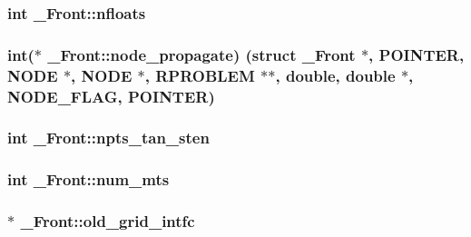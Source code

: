 \subsubsection[{\texorpdfstring{nfloats}{nfloats}}]{\setlength{\rightskip}{0pt plus 5cm}int \+\_\+\+Front\+::nfloats}\hypertarget{struct___front_ad141d8957da70837a6f62981b4fb11d1}{}\label{struct___front_ad141d8957da70837a6f62981b4fb11d1}
\subsubsection[{\texorpdfstring{node\+\_\+propagate}{node_propagate}}]{\setlength{\rightskip}{0pt plus 5cm}int($\ast$ \+\_\+\+Front\+::node\+\_\+propagate) (struct {\bf \+\_\+\+Front} $\ast$, {\bf P\+O\+I\+N\+T\+ER}, {\bf N\+O\+DE} $\ast$, {\bf N\+O\+DE} $\ast$, {\bf R\+P\+R\+O\+B\+L\+EM} $\ast$$\ast$, double, double $\ast$, {\bf N\+O\+D\+E\+\_\+\+F\+L\+AG}, {\bf P\+O\+I\+N\+T\+ER})}\hypertarget{struct___front_afcc1bfedef10121cb7fda0c9508a4762}{}\label{struct___front_afcc1bfedef10121cb7fda0c9508a4762}
\subsubsection[{\texorpdfstring{npts\+\_\+tan\+\_\+sten}{npts_tan_sten}}]{\setlength{\rightskip}{0pt plus 5cm}int \+\_\+\+Front\+::npts\+\_\+tan\+\_\+sten}\hypertarget{struct___front_aa49e9ed13490637e01c1a56dde74660c}{}\label{struct___front_aa49e9ed13490637e01c1a56dde74660c}
\subsubsection[{\texorpdfstring{num\+\_\+mts}{num_mts}}]{\setlength{\rightskip}{0pt plus 5cm}int \+\_\+\+Front\+::num\+\_\+mts}\hypertarget{struct___front_aca17cee6329f7b800177a34c0592cbf8}{}\label{struct___front_aca17cee6329f7b800177a34c0592cbf8}
\subsubsection[{\texorpdfstring{old\+\_\+grid\+\_\+intfc}{old_grid_intfc}}]{$\ast$ \+\_\+\+Front\+::old\+\_\+grid\+\_\+intfc}\hypertarget{struct___front_a17e8a1ad45f5fabe876aded6e582c6c6}{}\label{struct___front_a17e8a1ad45f5fabe876aded6e582c6c6}
